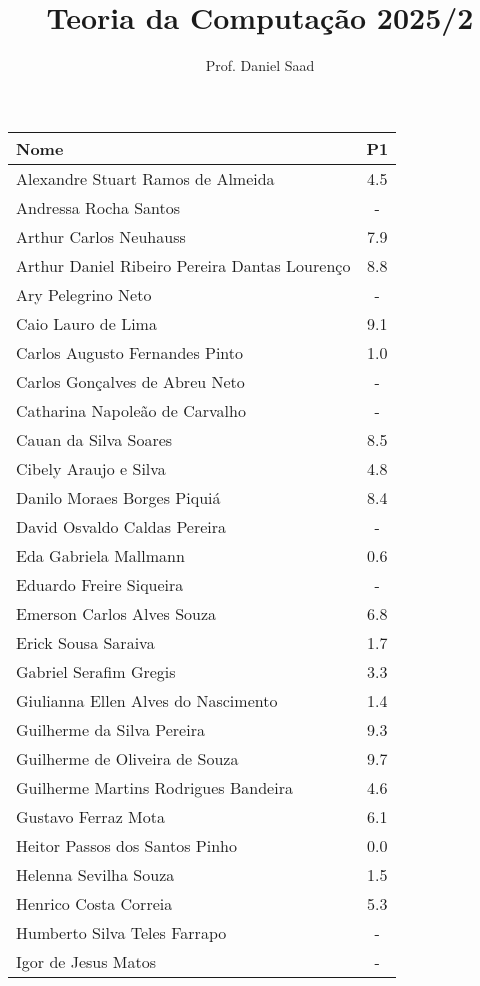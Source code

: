\documentclass{article}
\title{ Teoria da Computação 2025/2}
\date{}
\author{ Prof. Daniel Saad}
\begin{document}
 \maketitle
    \begin{longtable}{|l|c|}
    \hline
Nome & P1\\\hline \endhead   
Alexandre Stuart Ramos de Almeida & 4.5\\\hline
Andressa Rocha Santos & -\\\hline
Arthur Carlos Neuhauss & 7.9\\\hline
Arthur Daniel Ribeiro Pereira Dantas Lourenço & 8.8\\\hline
Ary Pelegrino Neto & -\\\hline
Caio Lauro de Lima & 9.1\\\hline
Carlos Augusto Fernandes Pinto & 1.0\\\hline
Carlos Gonçalves de Abreu Neto & -\\\hline
Catharina Napoleão de Carvalho & -\\\hline
Cauan da Silva Soares & 8.5\\\hline
Cibely Araujo e Silva & 4.8\\\hline
Danilo Moraes Borges Piquiá & 8.4\\\hline
David Osvaldo Caldas Pereira & -\\\hline
Eda Gabriela Mallmann & 0.6\\\hline
Eduardo Freire Siqueira & -\\\hline
Emerson Carlos Alves Souza & 6.8\\\hline
Erick Sousa Saraiva & 1.7\\\hline
Gabriel Serafim Gregis & 3.3\\\hline
Giulianna Ellen Alves do Nascimento & 1.4\\\hline
Guilherme da Silva Pereira & 9.3\\\hline
Guilherme de Oliveira de Souza & 9.7\\\hline
Guilherme Martins Rodrigues Bandeira & 4.6\\\hline
Gustavo Ferraz Mota & 6.1\\\hline
Heitor Passos dos Santos Pinho & 0.0\\\hline
Helenna Sevilha Souza & 1.5\\\hline
Henrico Costa Correia & 5.3\\\hline
Humberto Silva Teles Farrapo & -\\\hline
Igor de Jesus Matos & -\\\hline

\end{longtable}
\end{document}
